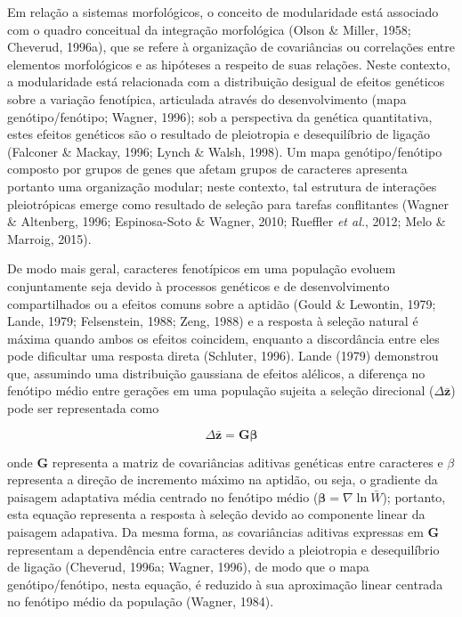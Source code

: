 \documentclass[12pt,twoside]{report}
\begin{document}
Em relação a sistemas morfológicos, o conceito de modularidade está
associado com o quadro conceitual da integração morfológica (Olson \&
Miller, 1958; Cheverud, 1996a), que se refere à organização de
covariâncias ou correlações entre elementos morfológicos e as hipóteses
a respeito de suas relações. Neste contexto, a modularidade está
relacionada com a distribuição desigual de efeitos genéticos sobre a
variação fenotípica, articulada através do desenvolvimento (mapa
genótipo/fenótipo; Wagner, 1996); sob a perspectiva da genética
quantitativa, estes efeitos genéticos são o resultado de pleiotropia e
desequilíbrio de ligação (Falconer \& Mackay, 1996; Lynch \& Walsh,
1998). Um mapa genótipo/fenótipo composto por grupos de genes que afetam
grupos de caracteres apresenta portanto uma organização modular; neste
contexto, tal estrutura de interações pleiotrópicas emerge como
resultado de seleção para tarefas conflitantes (Wagner \& Altenberg,
1996; Espinosa-Soto \& Wagner, 2010; Rueffler \emph{et al.}, 2012; Melo
\& Marroig, 2015).

De modo mais geral, caracteres fenotípicos em uma população evoluem
conjuntamente seja devido à processos genéticos e de desenvolvimento
compartilhados ou a efeitos comuns sobre a aptidão (Gould \& Lewontin,
1979; Lande, 1979; Felsenstein, 1988; Zeng, 1988) e a resposta à seleção
natural é máxima quando ambos os efeitos coincidem, enquanto a
discordância entre eles pode dificultar uma resposta direta (Schluter,
1996). Lande (1979) demonstrou que, assumindo uma distribuição gaussiana
de efeitos alélicos, a diferença no fenótipo médio entre gerações em uma
população sujeita a seleção direcional ($\Delta\bar{\mathbf{z}}$) pode
ser representada como

\begin{equation}
\Delta\bar{\mathbf{z}} = \mathbf{G}\boldsymbol{\beta}
\label{eq:lande}
\end{equation}

onde $\mathbf{G}$ representa a matriz de covariâncias aditivas genéticas
entre caracteres e $\beta$ representa a direção de incremento máximo na
aptidão, ou seja, o gradiente da paisagem adaptativa média centrado no
fenótipo médio ($\boldsymbol{\beta} = \nabla \ln \bar{W}$); portanto,
esta equação representa a resposta à seleção devido ao componente linear
da paisagem adapativa. Da mesma forma, as covariâncias aditivas
expressas em $\mathbf{G}$ representam a dependência entre caracteres
devido a pleiotropia e desequilíbrio de ligação (Cheverud, 1996a;
Wagner, 1996), de modo que o mapa genótipo/fenótipo, nesta equação, é
reduzido à sua aproximação linear centrada no fenótipo médio da
população (Wagner, 1984).
\end{document}
